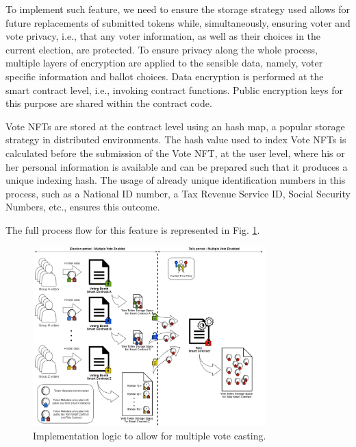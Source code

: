\documentclass[../main.tex]{subfiles}
\begin{document}
        \par
        To implement such feature, we need to ensure the storage strategy used allows for future replacements of submitted tokens while, simultaneously, ensuring voter and vote privacy, i.e., that any voter information, as well as their choices in the current election, are protected. To ensure privacy along the whole process, multiple layers of encryption are applied to the sensible data, namely, voter specific information and ballot choices. Data encryption is performed at the smart contract level, i.e., invoking contract functions. Public encryption keys for this purpose are shared within the contract code.
        \par
        Vote NFTs are stored at the contract level using an hash map, a popular storage strategy in distributed environments. The hash value used to index Vote NFTs is calculated before the submission of the Vote NFT, at the user level, where his or her personal information is available and can be prepared such that it produces a unique indexing hash. The usage of already unique identification numbers in this process, such as a National ID number, a Tax Revenue Service ID, Social Security Numbers, etc., ensures this outcome.
        \par
        The full process flow for this feature is represented in Fig. \ref{fig:multiple_vote_casting}.

        \begin{figure}[htp]
            \centering
            \includegraphics[width=0.8\textwidth]{../Images/MultipleVoteCastingLogic.png}
            \caption{Implementation logic to allow for multiple vote casting.}
            \label{fig:multiple_vote_casting}
        \end{figure}
\end{document}
